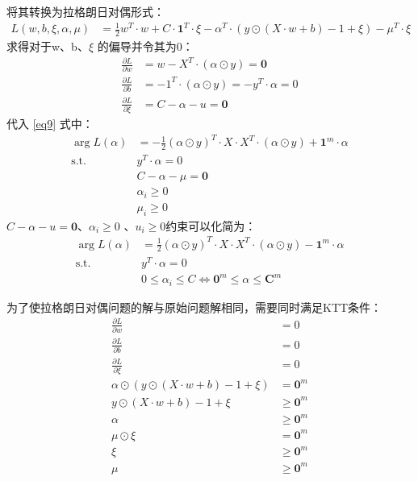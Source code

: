 \documentclass[12pt, a4paper, oneside]{ctexart}
\begin{document}
将其转换为拉格朗日对偶形式：
\begin{align}
    L(w, b, \xi, {\alpha}, \mu ) &= \frac{1}{2}w^T \cdot w + C \cdot {\boldsymbol{1}^T} \cdot \xi  - {\alpha} ^T \cdot  (y \odot (X \cdot w + b) - 1 + \xi) - \mu^T \cdot \xi  \label{eq9} 
\end{align}
求得对于w、b、$\xi$ 的偏导并令其为0：
\begin{align}
    \frac{\partial L}{\partial w} &= w - X^T\cdot(\alpha \odot y) = \boldsymbol{0} \nonumber \\
    \frac{\partial L}{\partial b} &= - 1^T\cdot(\alpha \odot y) = - y^T \cdot \alpha = 0  \nonumber \\
    \frac{\partial L}{\partial \xi} &= C - \alpha - u  = \boldsymbol{0} \nonumber 
\end{align}
代入 \eqref{eq9} 式中： 
\begin{align}
    \mathop{\arg\max_{\alpha}}  L({\alpha}) &= -\frac{1}{2}(\alpha \odot y)^T \cdot X \cdot X^T \cdot (\alpha \odot y) + \boldsymbol{1}^m \cdot \alpha \nonumber \\
    \mathrm{ s.t. }\ \   &y^T \cdot \alpha = 0 \nonumber \\
    &C - \alpha - \mu \nonumber  = \boldsymbol{0} \nonumber \\
    &\alpha_i \geq 0 \nonumber \\
    &\mu_i \geq 0 \nonumber 
\end{align}
$C - \alpha - u   = \boldsymbol{0} $、$ \alpha_i \geq 0 $ 、$u_i \geq 0 $约束可以化简为：
\begin{align}
    \mathop{\arg\min_{\alpha}}  L({\alpha}) &= \frac{1}{2}(\alpha \odot y)^T \cdot X \cdot X^T \cdot (\alpha \odot y) - \boldsymbol{1}^m \cdot \alpha \label{eq10}\\
    \mathrm{ s.t. }\ \   &y^T \cdot \alpha = 0 \nonumber \\
    & 0 \leq \alpha_i  \leq C  \Leftrightarrow   \boldsymbol{0}^m \leq \alpha \leq \boldsymbol{C}^m \nonumber
\end{align}

为了使拉格朗日对偶问题的解与原始问题解相同，需要同时满足KTT条件：
\begin{align}
    \frac{\partial L}{\partial w} &= 0 \nonumber \\
    \frac{\partial L}{\partial b} &= 0 \nonumber \\
    \frac{\partial L}{\partial \xi} &= 0 \nonumber \\
    {\alpha} \odot  (y \odot (X \cdot w + b) - 1 + \xi) &= \boldsymbol{0}^m \nonumber \\
    y \odot (X \cdot w + b) - 1  + \xi &\geq \boldsymbol{0}^m \nonumber \\
    {\alpha} &\geq \boldsymbol{0}^m  \nonumber \\
    \mu \odot \xi &=  \boldsymbol{0}^m \nonumber \\
    \xi &\geq \boldsymbol{0}^m  \nonumber \\
    \mu &\geq \boldsymbol{0}^m  \nonumber 
\end{align}
\end{document}
